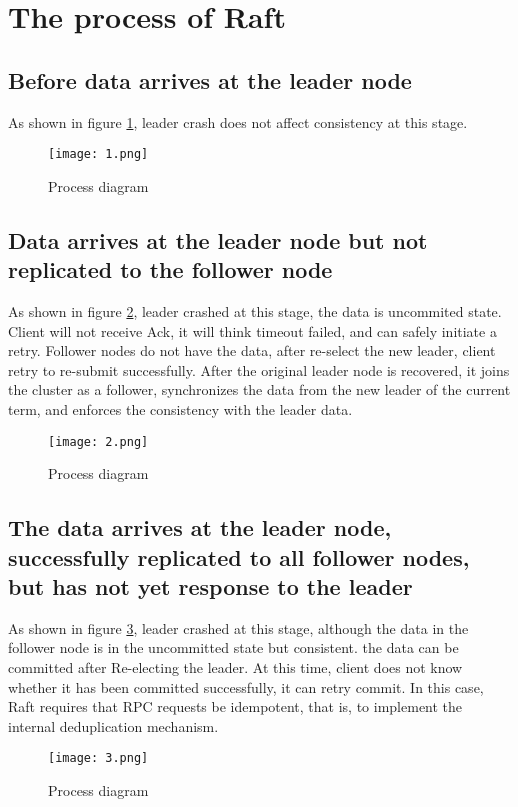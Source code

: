 \documentclass{report}
\begin{document}
\section{The process of Raft}
\subsection{Before data arrives at the leader node}
As shown in figure \ref{fig:1}, leader crash does not affect consistency at this stage.
\begin{figure}[H]
    \centering
    \texttt{[image: 1.png]}
    \caption{Process diagram}
    \label{fig:1}
\end{figure}

\subsection{Data arrives at the leader node but not replicated to the follower node}
 As shown in figure \ref{fig:2}, leader crashed at this stage, the data is uncommited state. Client will not receive Ack, it will think timeout failed, and can safely initiate a retry. Follower nodes do not have the data, after re-select the new leader, client retry to re-submit successfully. After the original leader node is recovered, it joins the cluster as a follower, synchronizes the data from the new leader of the current term, and enforces the consistency with the leader data.
\begin{figure}[H]
    \centering
    \texttt{[image: 2.png]}
    \caption{Process diagram}
    \label{fig:2}
\end{figure}


\subsection{The data arrives at the leader node, successfully replicated to all follower nodes, but has not yet response to the leader}
As shown in figure \ref{fig:3}, leader crashed at this stage, although the data in the follower node is in the uncommitted state but consistent. the data can be committed after Re-electing the leader. At this time, client does not know whether it has been committed successfully, it can retry commit. In this case, Raft requires that RPC requests be idempotent, that is, to implement the internal deduplication mechanism.
\begin{figure}[H]
    \centering
    \texttt{[image: 3.png]}
    \caption{Process diagram}
    \label{fig:3}
\end{figure}
\end{document}
